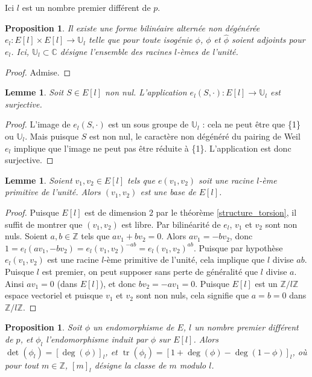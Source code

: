 \documentclass{article}
\theoremstyle{plain}%
\newtheorem{prop}[thm]{Proposition}
\newtheorem{lem}[thm]{Lemme}
\theoremstyle{definition}%
\newcommand{\Z}{\mathbb{Z}}
\newcommand{\U}{\mathbb{U}}
\newcommand{\h}{\widehat}
\DeclareMathOperator{\tr}{tr}
\begin{document}
Ici $l$ est un nombre premier différent de $p$. 

\begin{prop}
  \label{pairing}
  Il existe une forme bilinéaire alternée non dégénérée 
  $e_l : E[l] \times E[l] \to \mathbb{U}_l$ telle que pour toute isogénie $\phi$, $\phi$ et $\h\phi$ soient adjoints pour $e_l$.
  Ici, $\mathbb{U}_l \subset \mathbb{C}$ 
  désigne l'ensemble des racines $l$-èmes de l'unité.
\end{prop}

\begin{proof}
  Admise.
\end{proof}

\begin{lem}
  \label{surj_el}
  Soit $S\in E[l]$ non nul. L'application $e_l(S,\cdot):E[l] \to \mathbb{U}_l$ est surjective.
\end{lem}

\begin{proof}
  L'image de  $e_l(S,\cdot)$ est un sous groupe de $\mathbb{U}_l$ : cela ne peut être que \{1\} ou $\U_l$. Mais puisque $S$ est non nul, le caractère non dégénéré du pairing de Weil $e_l$ implique que l'image ne peut pas être réduite à \{1\}. L'application est donc surjective.
\end{proof}

\begin{lem}
  \label{pairing_base}
  Soient $v_1, v_2\in E[l]$ tels que $e(v_1, v_2)$ soit une racine $l$-ème primitive de l'unité. Alors $(v_1, v_2)$ est une base de $E[l]$. 
\end{lem}

\begin{proof}
  Puisque $E[l]$ est de dimension $2$ par le théorème \ref{structure_torsion}, il suffit de montrer que $(v_1, v_2)$ est libre. Par bilinéarité de $e_l$, $v_1$ et $v_2$ sont non nuls. Soient $a, b\in\Z$ tels que $av_1 + bv_2 = 0$. Alors $av_1 = -bv_2$, donc $1 = e_l(av_1, -bv_2) = e_l(v_1, v_2)^{-ab} = e_l(v_1, v_2)^{ab}$. Puisque par hypothèse $e_l(v_1, v_2)$ est une racine $l$-ème primitive de l'unité, cela implique que $l$ divise $ab$. Puisque $l$ est premier, on peut supposer sans perte de généralité que $l$ divise $a$. Ainsi $av_1 = 0$ (dans $E[l]$), et donc $bv_2=-av_1=0$. Puisque $E[l]$ est un $\Z/l\Z$ espace vectoriel et puisque $v_1$ et $v_2$ sont non nuls, cela signifie que $a=b=0$ dans $\Z/l\Z$.
\end{proof}

\begin{prop}
  \label{dettr}
  Soit $\phi$ un endomorphisme de $E$, $l$ un nombre premier différent de $p$, et $\phi_l$ l'endomorphisme induit par $\phi$ sur $E[l]$. Alors $\det(\phi_l) = [\deg(\phi)]_l$, et $\tr(\phi_l) = [1 + \deg(\phi) - \deg(1-\phi)]_l$, où pour tout $m\in\Z$, $[m]_l$ désigne la classe de $m$ modulo $l$. 
\end{prop}
\end{document}
